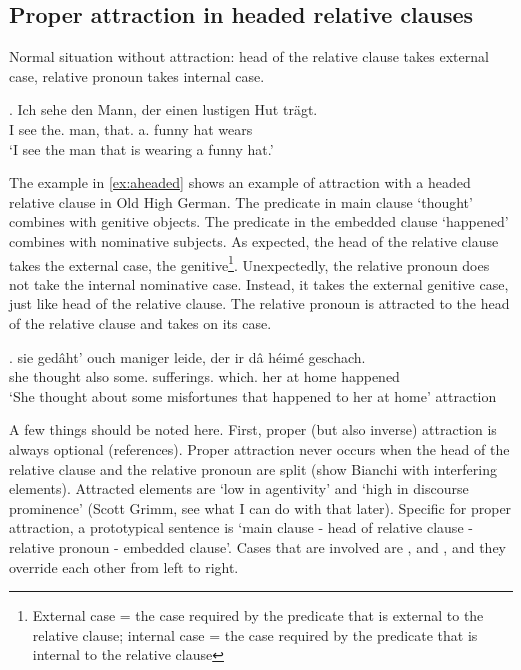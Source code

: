\subsection{Proper attraction in headed relative clauses}\label{sec:attheaded}

Normal situation without attraction: head of the relative clause takes external case, relative pronoun takes internal case.

\exg. Ich sehe den Mann, der einen lustigen Hut trägt.\\
I see the. man, that. a. funny hat wears\\
`I see the man that is wearing a funny hat.'

The example in \ref{ex:aheaded} shows an example of attraction with a headed relative clause in Old High German. The predicate in main clause  `thought' combines with genitive objects. The predicate in the embedded clause  `happened' combines with nominative subjects. As expected, the head of the relative clause takes the external case, the genitive\footnote{External case = the case required by the predicate that is external to the relative clause; internal case = the case required by the predicate that is internal to the relative clause}. Unexpectedly, the relative pronoun does not take the internal nominative case. Instead, it takes the external genitive case, just like head of the relative clause. The relative pronoun is attracted to the head of the relative clause and takes on its case.

\exg. sie gedâht' ouch maniger leide, der ir dâ héimé geschach.\\
she thought also some. sufferings. which. her at home happened\\
`She thought about some misfortunes that happened to her at home' \label{ex:aheaded}\hfill attraction

A few things should be noted here. First, proper (but also inverse) attraction is always optional (references). Proper attraction never occurs when the head of the relative clause and the relative pronoun are split (show Bianchi with interfering elements). Attracted elements are `low in agentivity' and `high in discourse prominence' (Scott Grimm, see what I can do with that later). Specific for proper attraction, a prototypical sentence is `main clause - head of relative clause - relative pronoun - embedded clause'. Cases that are involved are ,  and , and they override each other from left to right.

